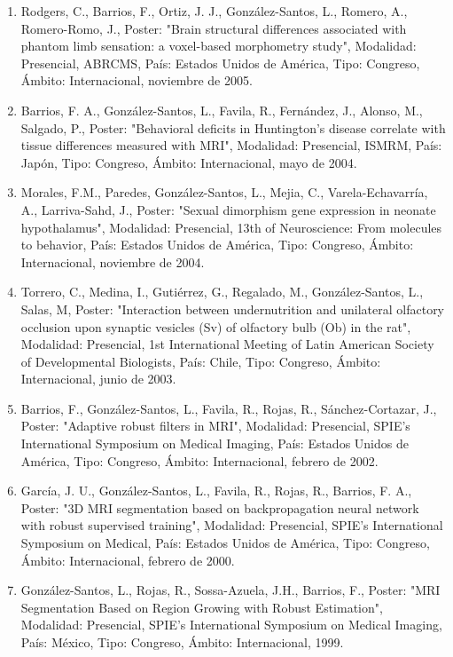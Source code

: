 \begin{enumerate}
\item Rodgers, C., Barrios, F., Ortiz, J. J., González-Santos, L., Romero, A., Romero-Romo, J., Poster: "Brain structural 
differences associated with phantom limb sensation: a voxel-based morphometry study", Modalidad: Presencial, ABRCMS, País: 
Estados Unidos de América, Tipo: Congreso, Ámbito: Internacional, noviembre de 2005.

\item Barrios, F. A., González-Santos, L., Favila, R., Fernández, J., Alonso, M., Salgado, P., Poster: "Behavioral deficits 
in Huntington’s disease correlate with tissue differences measured with MRI", Modalidad: Presencial, ISMRM, País: Japón, 
Tipo: Congreso, Ámbito: Internacional, mayo de 2004.

\item Morales, F.M., Paredes, González-Santos, L., Mejia, C., Varela-Echavarría, A., Larriva-Sahd, J., Poster: "Sexual 
dimorphism gene expression in neonate hypothalamus", Modalidad: Presencial, 13th of Neuroscience: From molecules to 
behavior, País: Estados Unidos de América, Tipo: Congreso, Ámbito: Internacional, noviembre de 2004.

\item Torrero, C., Medina, I., Gutiérrez, G., Regalado, M., González-Santos, L., Salas, M, Poster: "Interaction between 
undernutrition and unilateral olfactory occlusion upon synaptic vesicles (Sv) of olfactory bulb (Ob) in the rat", 
Modalidad: Presencial, 1st International Meeting of Latin American Society of Developmental Biologists, País: Chile, Tipo: 
Congreso, Ámbito: Internacional, junio de 2003.

\item Barrios, F., González-Santos, L., Favila, R., Rojas, R., Sánchez-Cortazar, J., Poster: "Adaptive robust filters in 
MRI", Modalidad: Presencial, SPIE's International Symposium on Medical Imaging, País: Estados Unidos de América, Tipo: 
Congreso, Ámbito: Internacional, febrero de 2002.

\item García, J. U., González-Santos, L., Favila, R., Rojas, R., Barrios, F. A., Poster: "3D MRI segmentation based on 
backpropagation neural network with robust supervised training", Modalidad: Presencial, SPIE's International Symposium on 
Medical, País: Estados Unidos de América, Tipo: Congreso, Ámbito: Internacional, febrero de 2000.

\item González-Santos, L., Rojas, R., Sossa-Azuela, J.H., Barrios, F., Poster: "MRI Segmentation Based on Region Growing with 
Robust Estimation", Modalidad: Presencial, SPIE's International Symposium on Medical Imaging, País: México, Tipo: Congreso, 
Ámbito: Internacional, 1999.


\end{enumerate}
